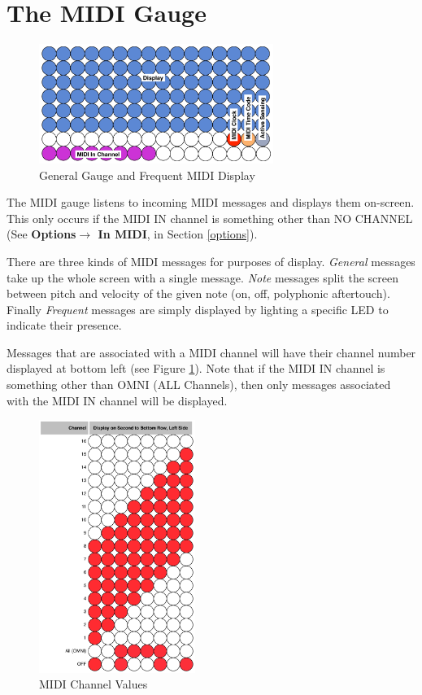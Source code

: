 \documentclass{article}
\begin{document}
\section {The MIDI Gauge}

\begin{figure}
\vspace{-4.5em}\includegraphics[width=3in]{GeneralGauge.pdf}
\vspace{-2em}\caption{\small General Gauge and Frequent MIDI Display}\vspace{-1em}
\label{generalgauge}
\end{figure}

The MIDI gauge listens to incoming MIDI messages and displays them on-screen.  This only occurs if the MIDI IN channel is something other than NO CHANNEL (See {\bf Options\(\boldsymbol\rightarrow\) In MIDI}, in Section \ref{options}).

There are three kinds of MIDI messages for purposes of display.  {\it General} messages take up the whole screen with a single message.  {\it Note} messages split the screen between pitch and velocity of the given note (on, off, polyphonic aftertouch).  Finally {\it Frequent} messages are simply displayed by lighting a specific LED to indicate their presence. 

Messages that are associated with a MIDI channel will have their channel number displayed at bottom left (see Figure \ref{generalgauge}).  Note that if the MIDI IN channel is something other than OMNI (ALL Channels), then only messages associated with the MIDI IN channel will be displayed.





\begin{figure}
\vspace{-2em}\includegraphics[width=2in]{midichannel.pdf}
\vspace{-2em}\caption{\small MIDI Channel Values}\vspace{-5em}
\label{midichannelvalues}
\end{figure}
\end{document}
